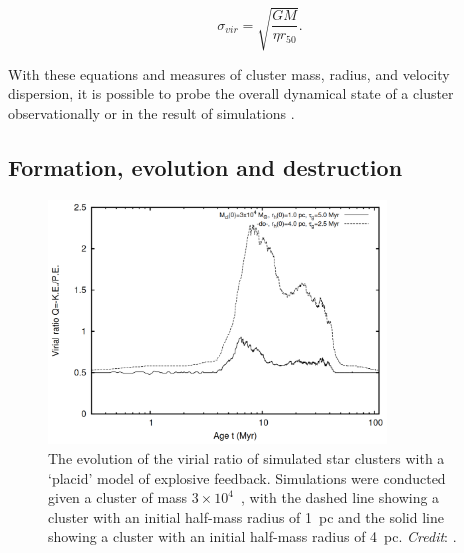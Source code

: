 \begin{equation}
	\sigma_{vir} = \sqrt{\frac{GM}{\eta r_{50}}}.
	\label{eqn:intro:virial_velocity}
\end{equation}

With these equations and measures of cluster mass, radius, and velocity dispersion, it is possible to probe the overall dynamical state of a cluster observationally or in the result of simulations \citep{banerjee_how_2017}.



\subsection{Formation, evolution and destruction}
\label{sec:intro:theory:evolution}

\begin{figure}[tb]
	\centering
	\includegraphics[width=0.8\textwidth]{fig/c1/virialisation_placid_gas_expulsion.png}
	\caption[The evolution of the virial ratio of simulated star clusters with a `placid' model of explosive feedback]{The evolution of the virial ratio of simulated star clusters with a `placid' model of explosive feedback. Simulations were conducted given a cluster of mass  $3\times10^4$~\MSun, with the dashed line showing a cluster with an initial half-mass radius of 1~pc and the solid line showing a cluster with an initial half-mass radius of 4~pc. \emph{Credit}: \cite{banerjee_how_2017}.}
	\label{fig:intro:theory:feedback}
\end{figure}

